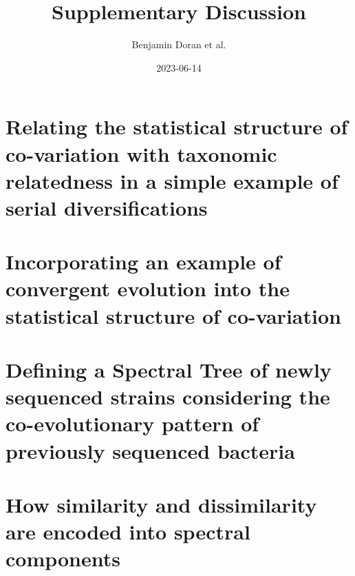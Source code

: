 \documentclass[
  letterpaper,
  DIV=11,
  numbers=noendperiod]{scrartcl}
\title{Supplementary Discussion}
\author{Benjamin Doran et al.}
\date{2023-06-14}
\renewcommand*\contentsname{Table of contents}
\newcommand\contentsname{Table of contents}
\begin{document}
\maketitle
\ifdefined\Shaded\renewenvironment{Shaded}{\begin{tcolorbox}[sharp corners, enhanced, breakable, frame hidden, borderline west={3pt}{0pt}{shadecolor}, boxrule=0pt, interior hidden]}{\end{tcolorbox}}\fi

\renewcommand*\contentsname{Table of contents}
{
\hypersetup{linkcolor=}
\setcounter{tocdepth}{3}
\tableofcontents
}
\hypertarget{relating-the-statistical-structure-of-co-variation-with-taxonomic-relatedness-in-a-simple-example-of-serial-diversifications}{%
\section{Relating the statistical structure of co-variation with
taxonomic relatedness in a simple example of serial
diversifications}\label{relating-the-statistical-structure-of-co-variation-with-taxonomic-relatedness-in-a-simple-example-of-serial-diversifications}}

\hypertarget{incorporating-an-example-of-convergent-evolution-into-the-statistical-structure-of-co-variation}{%
\section{Incorporating an example of convergent evolution into the
statistical structure of
co-variation}\label{incorporating-an-example-of-convergent-evolution-into-the-statistical-structure-of-co-variation}}

\hypertarget{defining-a-spectral-tree-of-newly-sequenced-strains-considering-the-co-evolutionary-pattern-of-previously-sequenced-bacteria}{%
\section{Defining a Spectral Tree of newly sequenced strains considering
the co-evolutionary pattern of previously sequenced
bacteria}\label{defining-a-spectral-tree-of-newly-sequenced-strains-considering-the-co-evolutionary-pattern-of-previously-sequenced-bacteria}}

\hypertarget{how-similarity-and-dissimilarity-are-encoded-into-spectral-components}{%
\section{How similarity and dissimilarity are encoded into spectral
components}\label{how-similarity-and-dissimilarity-are-encoded-into-spectral-components}}
\end{document}
